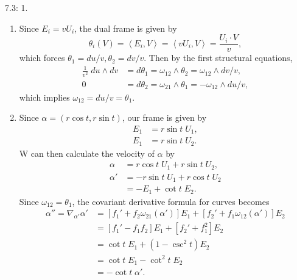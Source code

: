 \documentclass[10pt]{report}
\begin{document}
\begin{exer}[]
7.3: 1.
\end{exer}
\begin{enumerate}
	\item Since $E_{i}=v U_{i}$, the dual frame is given by
		\[
			\theta_{i}(V) = \left\langle E_i,V \right\rangle=\left\langle vU_i,V \right\rangle = \frac{U_{i}\cdot V}{v} ,
		\] which forces $\theta_1=du/v, \theta_2 = dv/v$. Then by the first structural equations,
		\begin{align*}
			\frac{1}{v^2} \;du \wedge dv &= d\theta_1 = \omega_{12}\wedge \theta_2 = \omega_{12} \wedge dv/v,\\
			0 &= d\theta_2 = \omega_{21}\wedge \theta_1 = -\omega_{12} \wedge du/v,
		\end{align*}
		which implies $\omega_{12} = du/v = \theta_1$.

	\item Since $\alpha=(r \cos t, r\sin t)$, our frame is given by
		\begin{align*}
			E_1 &= r \sin t \; U_1, \\
			E_1 &= r \sin t \; U_2.
		\end{align*}
		W can then calculate the velocity of $\alpha$ by
		\begin{align*}
			\alpha &= r \cos t \;U_1 + r \sin t \;U_2, \\
			\alpha' &= -r \sin t \;U_1 + r \cos t \;U_2 \\
				&= -E_1 + \cot t \;E_2.
		\end{align*}
		Since $\omega_{12}=\theta_1$, the covariant derivative formula for curves becomes
		\begin{align*}
			\alpha''=\nabla_{\alpha'}\alpha' &= \left[ f_1'+f_2 \omega_{21}(\alpha') \right]E_1 + \left[ f_2'+f_1\omega_{12}(\alpha') \right]E_2 \\
						&= \left[ f_1'-f_1f_2 \right]E_1+ \left[ f_2'+f_1^2 \right]E_2 \\
						&= \cot t\; E_1 + (1-\csc^2 t) E_2 \\
						&= \cot t\; E_1 - \cot^2 t \;E_2 \\
						&= -\cot t \;\alpha'.
		\end{align*}


\end{enumerate}
\end{document}
